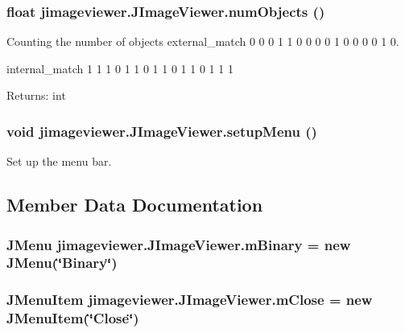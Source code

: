 \subsubsection{\setlength{\rightskip}{0pt plus 5cm}float jimageviewer.JImage\-Viewer.num\-Objects ()}\label{classjimageviewer_1_1_j_image_viewer_1152427dcde91007796999389e901c2e}


Counting the number of objects external\_\-match 0 0 0 1 1 0 0 0 0 1 0 0 0 0 1 0. 

internal\_\-match 1 1 1 0 1 1 0 1 1 0 1 1 0 1 1 1

\begin{Desc}
\item[Returns:]int \end{Desc}
\subsubsection{\setlength{\rightskip}{0pt plus 5cm}void jimageviewer.JImage\-Viewer.setup\-Menu ()\hspace{0.3cm}{\tt  [private]}}\label{classjimageviewer_1_1_j_image_viewer_783a7e1a729c2d39d0e3548acfdcfe7c}


Set up the menu bar. 



\subsection{Member Data Documentation}
\subsubsection{\setlength{\rightskip}{0pt plus 5cm}JMenu {\bf jimageviewer.JImage\-Viewer.m\-Binary} = new JMenu(\char`\"{}Binary\char`\"{})\hspace{0.3cm}{\tt  [package]}}\label{classjimageviewer_1_1_j_image_viewer_3dc6b2cac15ab3cfd7540eea1c19e279}


\subsubsection{\setlength{\rightskip}{0pt plus 5cm}JMenu\-Item {\bf jimageviewer.JImage\-Viewer.m\-Close} = new JMenu\-Item(\char`\"{}Close\char`\"{})\hspace{0.3cm}{\tt  [package]}}\label{classjimageviewer_1_1_j_image_viewer_b06fd64172b6bcda6da0017ae52e746a}


